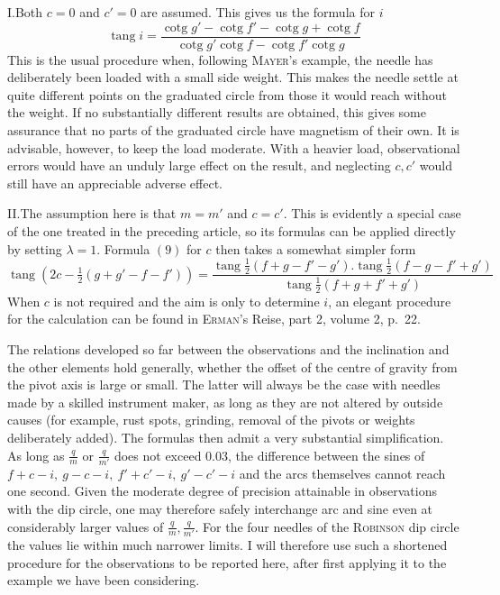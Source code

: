 I.\quad Both $c=0$ and $c'=0$ are assumed. This gives us the formula for $i$
\[
\operatorname{tang}i=\frac{\operatorname{cotg}g'-\operatorname{cotg}f'-\operatorname{cotg}g+\operatorname{cotg}f}{\operatorname{cotg}g'\operatorname{cotg}f-\operatorname{cotg}f'\operatorname{cotg}g}
\]
This is the usual procedure when, following \textsc{Mayer}'s example, the needle has deliberately been loaded with a small side weight. This makes the needle settle at quite different points on the graduated circle from those it would reach without the weight. If no substantially different results are obtained, this gives some assurance that no parts of the graduated circle have magnetism of their own. It is advisable, however, to keep the load moderate. With a heavier load, observational errors would have an unduly large effect on the result, and neglecting $c,c'$ would still have an appreciable adverse effect.

II.\quad The assumption here is that $m=m'$ and $c=c'$. This is evidently a special case of the one treated in the preceding article, so its formulas can be applied directly by setting $\lambda=1$. Formula $(9)$ for $c$ then takes a somewhat simpler form
\[
\operatorname{tang}(2c-\tfrac12(g+g'-f-f'))=\frac{\operatorname{tang}\frac12(f+g-f'-g').\operatorname{tang}\frac12(f-g-f'+g')}{\operatorname{tang}\frac12(f+g+f'+g')}
\]
When $c$ is not required and the aim is only to determine $i$, an elegant procedure for the calculation can be found in \textsc{Erman}'s Reise, part 2, volume 2, p.\ 22.

The relations developed so far between the observations and the inclination and the other elements hold generally, whether the offset of the centre of gravity from the pivot axis is large or small. The latter will always be the case with needles made by a skilled instrument maker, as long as they are not altered by outside causes (for example, rust spots, grinding, removal of the pivots or weights deliberately added). The formulas then admit a very substantial simplification. As long as $\frac{q}{m}$ or $\frac{q}{m'}$ does not exceed $0.03$, the difference between the sines of $f+c-i,\ g-c-i,\ f'+c'-i,\ g'-c'-i$ and the arcs themselves cannot reach one second. Given the moderate degree of precision attainable in observations with the dip circle, one may therefore safely interchange arc and sine even at considerably larger values of $\frac{q}{m},\frac{q}{m'}$. For the four needles of the \textsc{Robinson} dip circle the values lie within much narrower limits. I will therefore use such a shortened procedure for the observations to be reported here, after first applying it to the example we have been considering.

